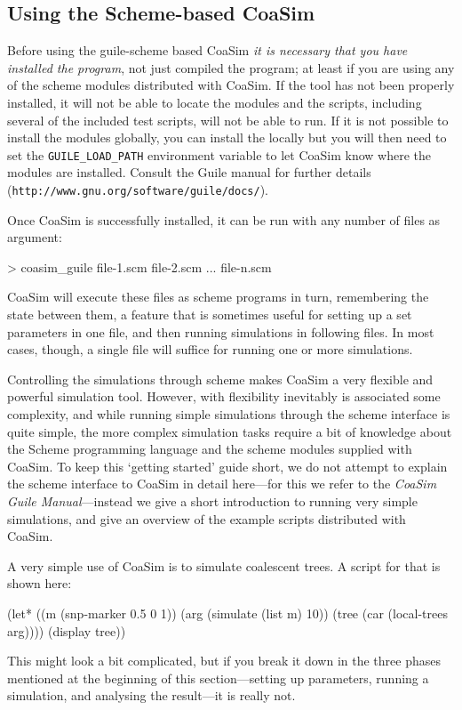\documentclass{manual}
\begin{document}
\subsection{Using the Scheme-based CoaSim}
\label{sec:using-scheme-based}

Before using the guile-scheme based CoaSim \emph{it is necessary that
  you have installed the program}, not just compiled the program; at
least if you are using any of the scheme modules distributed with
CoaSim.  If the tool has not been properly installed, it will not be
able to locate the modules and the scripts, including several of the
included test scripts, will not be able to run.  If it is not possible
to install the modules globally, you can install the locally but you
will then need to set the \verb?GUILE_LOAD_PATH? environment variable
to let CoaSim know where the modules are installed.  Consult the Guile
manual for further details (\verb?http://www.gnu.org/software/guile/docs/?).

Once CoaSim is successfully installed, it can be run with any number
of files as argument:
\begin{code}
> coasim_guile file-1.scm file-2.scm ... file-n.scm
\end{code}
CoaSim will execute these files as scheme programs in turn,
remembering the state between them, a feature that is sometimes useful
for setting up a set parameters in one file, and then running
simulations in following files.  In most cases, though, a single file
will suffice for running one or more simulations.

Controlling the simulations through scheme makes CoaSim a very
flexible and powerful simulation tool. However, with flexibility
inevitably is associated some complexity, and while running simple
simulations through the scheme interface is quite simple, the more
complex simulation tasks require a bit of knowledge about the Scheme
programming language and the scheme modules supplied with CoaSim.  To
keep this `getting started' guide short, we do not attempt to explain
the scheme interface to CoaSim in detail here---for this we refer to
the \emph{CoaSim Guile Manual}---instead we give a short introduction
to running very simple simulations, and give an overview of the
example scripts distributed with CoaSim.

A very simple use of CoaSim is to simulate coalescent trees.  A script
for that is shown here:
\begin{code}
(let* ((m (snp-marker 0.5 0 1))
       (arg (simulate (list m) 10))
       (tree (car (local-trees arg))))
  (display tree))
\end{code}
This might look a bit complicated, but if you break it down in the
three phases mentioned at the beginning of this section---setting up
parameters, running a simulation, and analysing the result---it is
really not.
\end{document}
